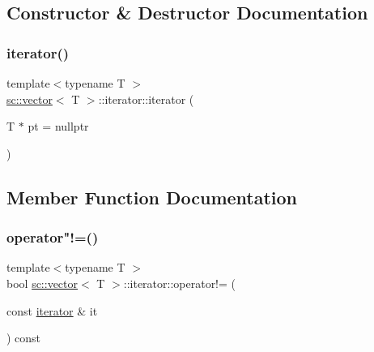 \subsection{Constructor \& Destructor Documentation}
\mbox{\label{classsc_1_1vector_1_1iterator_adcef8cb0104f9035bc98eacb4e2e29e7}} 
\subsubsection{\texorpdfstring{iterator()}{iterator()}}
{\footnotesize\ttfamily template$<$typename T $>$ \\
\hyperlink{classsc_1_1vector}{sc\+::vector}$<$ T $>$\+::iterator\+::iterator (\begin{DoxyParamCaption}\item[{T $\ast$}]{pt = {\ttfamily nullptr} }\end{DoxyParamCaption})\hspace{0.3cm}{\ttfamily [inline]}}



\subsection{Member Function Documentation}
\mbox{\label{classsc_1_1vector_1_1iterator_ae0f420848b61b2f1bd5c7dc414082d29}} 
\subsubsection{\texorpdfstring{operator"!=()}{operator!=()}}
{\footnotesize\ttfamily template$<$typename T $>$ \\
bool \hyperlink{classsc_1_1vector}{sc\+::vector}$<$ T $>$\+::iterator\+::operator!= (\begin{DoxyParamCaption}\item[{const \hyperlink{classsc_1_1vector_1_1iterator}{iterator} \&}]{it }\end{DoxyParamCaption}) const\hspace{0.3cm}{\ttfamily [inline]}}



